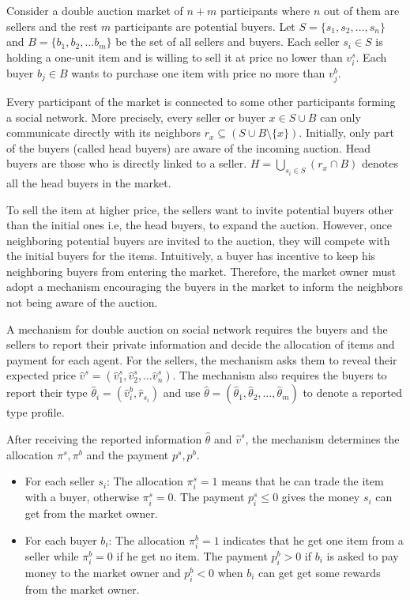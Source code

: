 Consider a double auction market of $n+m$ participants
where $n$ out of them are sellers and the rest $m$ participants are potential buyers. Let $S=\{s_1,s_2,\ldots, s_n\}$ and $B=\{b_1,b_2,\ldots b_m\}$ be the set of all sellers and buyers.
Each seller $s_i\in S$ is holding a one-unit item and is willing to sell it at price no lower than $v^s_i$. Each buyer $b_j\in B$ wants to purchase one item with price no more than $v^b_j$.

Every participant of the market is connected to some other participants forming a social network. More precisely, every seller or buyer $x\in S\cup B$ can only communicate directly with its neighbors $r_x\subseteq (S\cup B\setminus \{x\})$.
Initially, only part of the buyers (called head buyers) are aware of the incoming auction.
Head buyers are those who is directly linked to a seller.
$H = \bigcup_{s_i \in S} (r_x \cap B)$ denotes all the head buyers in the market.


To sell the item at higher price, the sellers want to invite potential buyers other than the initial ones i.e, the head buyers, to expand the auction.
However, once neighboring potential buyers are invited to the auction, they will compete with the initial buyers for the items. Intuitively, a buyer has incentive to keep his neighboring buyers from entering the market.
Therefore, the market owner must adopt a mechanism encouraging the buyers in the market to inform the neighbors not being aware of the auction.

A mechanism for double auction on social network requires the buyers and the sellers to report their private information and decide the allocation of items and payment for each agent.
For the sellers, the mechanism asks them to reveal their expected price $\hat v^s=(\hat v^s_1,\hat v^s_2,\ldots \hat v^s_n)$.
The mechanism also requires the buyers to report their type $\hat\theta_i = (\hat v^b_i, \hat r_{s_i})$ and use $\hat\theta = (\hat\theta_1,\hat\theta_2,\ldots,\hat\theta_m)$ to denote a reported type profile.

After receiving the reported information $\hat\theta$ and $\hat v^s$, the mechanism determines the allocation $\pi^s,\pi^b$ and the payment $p^s,p^b$.
\begin{itemize}
	\item For each seller $s_i$:
		The allocation $\pi^s_i = 1$ means that he can trade the item with a buyer, otherwise $\pi^s_i = 0$.
		The payment $p^s_i\leq 0$ gives the money $s_i$ can get from the market owner.
	\item For each buyer $b_i$:
		The allocation $\pi^b_i = 1$ indicates that he get one item from a seller while $\pi^b_i=0$ if he get no item.
		The payment $p^b_i>0$ if $b_i$ is asked to pay money to the market owner
		and $p^b_i<0$ when $b_i$ can get get some rewards from the market owner.
\end{itemize}


